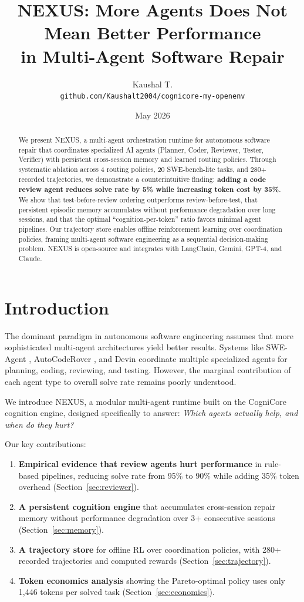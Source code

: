 \documentclass[11pt]{article}
\title{NEXUS: More Agents Does Not Mean Better Performance \\
in Multi-Agent Software Repair}
\author{
Kaushal T. \\
\texttt{github.com/Kaushalt2004/cognicore-my-openenv}
}
\date{May 2026}
\begin{document}
\maketitle

\begin{abstract}
We present NEXUS, a multi-agent orchestration runtime for autonomous software repair
that coordinates specialized AI agents (Planner, Coder, Reviewer, Tester, Verifier)
with persistent cross-session memory and learned routing policies.
Through systematic ablation across 4 routing policies, 20 SWE-bench-lite tasks,
and 280+ recorded trajectories, we demonstrate a counterintuitive finding:
\textbf{adding a code review agent reduces solve rate by 5\% while increasing
token cost by 35\%}. We show that test-before-review ordering outperforms
review-before-test, that persistent episodic memory accumulates without
performance degradation over long sessions, and that the optimal
``cognition-per-token'' ratio favors minimal agent pipelines.
Our trajectory store enables offline reinforcement learning over
coordination policies, framing multi-agent software engineering
as a sequential decision-making problem.
NEXUS is open-source and integrates with LangChain, Gemini, GPT-4, and Claude.
\end{abstract}

\section{Introduction}

The dominant paradigm in autonomous software engineering assumes that
more sophisticated multi-agent architectures yield better results.
Systems like SWE-Agent \citep{yang2024sweagent}, AutoCodeRover \citep{zhang2024autocoderover},
and Devin coordinate multiple specialized agents for planning, coding,
reviewing, and testing. However, the marginal contribution of each
agent type to overall solve rate remains poorly understood.

We introduce NEXUS, a modular multi-agent runtime built on the
CogniCore cognition engine, designed specifically to answer:
\textit{Which agents actually help, and when do they hurt?}

Our key contributions:
\begin{enumerate}
    \item \textbf{Empirical evidence that review agents hurt performance}
    in rule-based pipelines, reducing solve rate from 95\% to 90\%
    while adding 35\% token overhead (Section~\ref{sec:reviewer}).
    \item \textbf{A persistent cognition engine} that accumulates
    cross-session repair memory without performance degradation
    over 3+ consecutive sessions (Section~\ref{sec:memory}).
    \item \textbf{A trajectory store} for offline RL over coordination
    policies, with 280+ recorded trajectories and computed rewards
    (Section~\ref{sec:trajectory}).
    \item \textbf{Token economics analysis} showing the Pareto-optimal
    policy uses only 1,446 tokens per solved task (Section~\ref{sec:economics}).
\end{enumerate}
\end{document}

